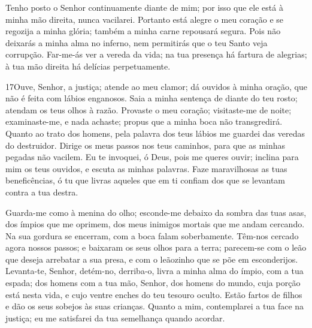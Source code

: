 Tenho posto o Senhor continuamente diante de mim; por isso que ele
está à minha mão direita, nunca vacilarei. Portanto está alegre
o meu coração e se regozija a minha glória; também a minha carne
repousará segura. Pois não deixarás a minha alma no inferno,
nem permitirás que o teu Santo veja corrupção. Far-me-ás ver
a vereda da vida; na tua presença há fartura de alegrias; à tua mão
direita há delícias perpetuamente.

\bigskip

\lettrine{17}{}Ouve, Senhor, a justiça; atende ao meu clamor;
dá ouvidos à minha oração, que não é feita com lábios enganosos.
Saia a minha sentença de diante do teu rosto; atendam os teus
olhos à razão. Provaste o meu coração; visitaste-me de noite;
examinaste-me, e nada achaste; propus que a minha boca não
transgredirá. Quanto ao trato dos homens, pela palavra dos teus
lábios me guardei das veredas do destruidor. Dirige os meus
passos nos teus caminhos, para que as minhas pegadas não vacilem.
Eu te invoquei, ó Deus, pois me queres ouvir; inclina para mim
os teus ouvidos, e escuta as minhas palavras. Faze maravilhosas
as tuas beneficências, ó tu que livras aqueles que em ti confiam dos
que se levantam contra a tua destra.

Guarda-me como à menina do olho; esconde-me debaixo da sombra das
tuas asas, dos ímpios que me oprimem, dos meus inimigos mortais
que me andam cercando. Na sua gordura se encerram, com a boca
falam soberbamente. Têm-nos cercado agora nossos passos; e
baixaram os seus olhos para a terra; parecem-se com o leão
que deseja arrebatar a sua presa, e com o leãozinho que se põe em
esconderijos. Levanta-te, Senhor, detém-no, derriba-o, livra
a minha alma do ímpio, com a tua espada; dos homens com a tua
mão, Senhor, dos homens do mundo, cuja porção está nesta vida, e
cujo ventre enches do teu tesouro oculto. Estão fartos de filhos e
dão os seus sobejos às suas crianças. Quanto a mim,
contemplarei a tua face na justiça; eu me satisfarei da tua
semelhança quando acordar.

\bigskip

